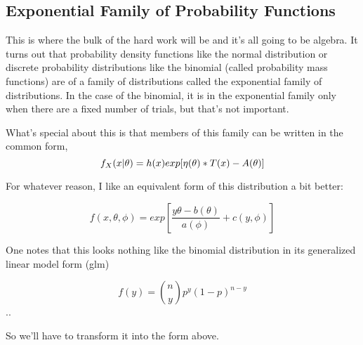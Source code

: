 \documentclass[
]{article}
\begin{document}
\hypertarget{exponential-family-of-probability-functions}{%
\subsection{Exponential Family of Probability
Functions}\label{exponential-family-of-probability-functions}}

This is where the bulk of the hard work will be and it's all going to be
algebra. It turns out that probability density functions like the normal
distribution or discrete probability distributions like the binomial
(called probability mass functions) are of a family of distributions
called the exponential family of distributions. In the case of the
binomial, it is in the exponential family only when there are a fixed
number of trials, but that's not important.

What's special about this is that members of this family can be written
in the common form,\\
\begin{equation}
  $$f_X(x|\theta) = h(x)exp[\eta(\theta)*T(x) - A(\theta)]$$

\end{equation}

For whatever reason, I like an equivalent form of this distribution a
bit better:

\[f(x, \theta, \phi) = exp[\frac{y\theta-b(\theta)}{a(\phi)} + c(y, \phi)]\]

One notes that this looks nothing like the binomial distribution in its
generalized linear model form (glm)

\[f(y) = {n \choose y}p^y(1-p)^{n-y}\] ..

So we'll have to transform it into the form above.
\end{document}
